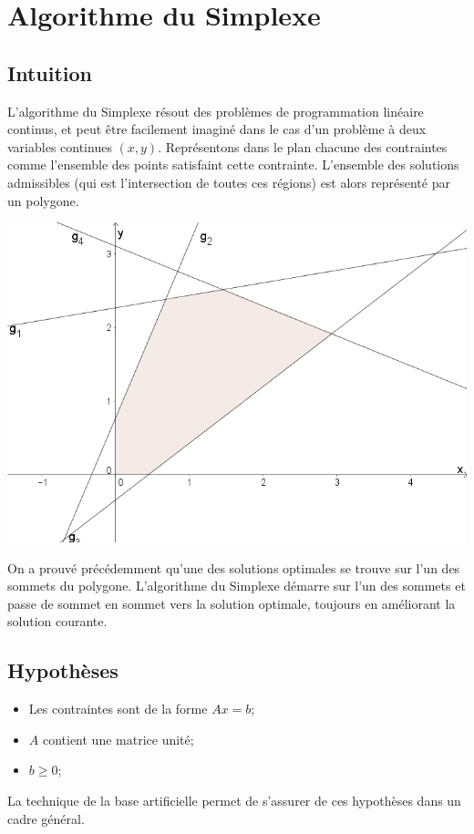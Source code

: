 \documentclass[a4paper]{report}
\theoremstyle{definition}
\theoremstyle{remark}
\theoremstyle{plain}
\begin{document}
\section{Algorithme du Simplexe}
\subsection{Intuition}
L'algorithme du Simplexe résout des problèmes de programmation linéaire continus,
et peut être facilement imaginé dans le cas d'un problème à deux variables
continues \((x,y)\). Représentons dans le plan chacune des contraintes comme
l'ensemble des points satisfaint cette contrainte. L'ensemble des solutions
admissibles (qui est l'intersection de toutes ces régions) est alors représenté
par un polygone.
\begin{center}\textbf{\textbf{}}
\includegraphics[width=\textwidth]{simplex-xy.png}
\end{center}
On a prouvé précédemment qu'une des solutions optimales se trouve sur l'un des
sommets du polygone. L'algorithme du Simplexe démarre sur l'un des sommets et
passe de sommet en sommet vers la solution optimale, toujours en améliorant la
solution courante.

\subsection{Hypothèses}
\begin{itemize}
	\item Les contraintes sont de la forme \(Ax=b\);
	\item \(A\) contient une matrice unité;
	\item \(b\ge 0\);
\end{itemize}
La technique de la base artificielle permet de s'assurer de ces hypothèses
dans un cadre général.
\end{document}
